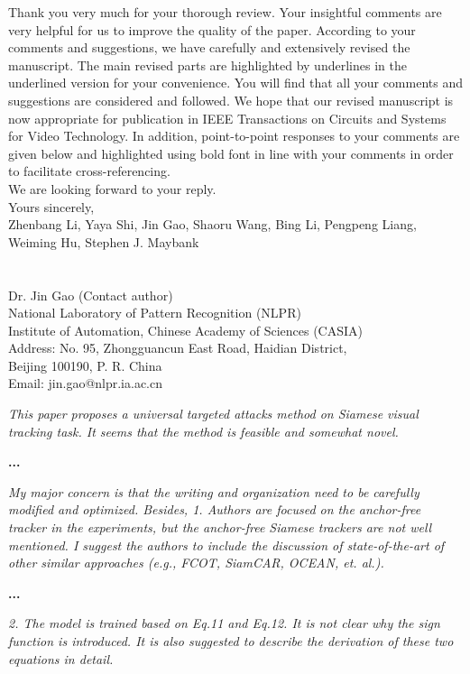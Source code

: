 \documentclass[12pt]{article}
\begin{document}
Thank you very much for your thorough review. Your insightful comments are very helpful for us to improve the quality of the paper. According to your comments and suggestions, we have carefully and extensively revised the manuscript. The main revised parts are highlighted by underlines in the underlined version for your convenience. You will find that all your comments and suggestions are considered and followed. We hope that our revised manuscript is now appropriate for publication in IEEE Transactions on Circuits and Systems for Video Technology.
In addition, point-to-point responses to your comments are given below and highlighted using bold font in line with your comments in order to facilitate cross-referencing.\\[10pt]
\indent We are looking forward to your reply.\\[10pt]
\noindent Yours sincerely,\\
\noindent Zhenbang Li, Yaya Shi, Jin Gao, Shaoru Wang, Bing Li, Pengpeng Liang, Weiming Hu, Stephen J. Maybank
\\
\\
\\
\noindent Dr. Jin Gao (Contact author)\\
\noindent National Laboratory of Pattern Recognition (NLPR)\\
\noindent Institute of Automation, Chinese Academy of Sciences (CASIA)\\
\noindent Address: No. 95, Zhongguancun East Road, Haidian District,\\
\noindent Beijing 100190, P. R. China\\
\noindent Email: jin.gao@nlpr.ia.ac.cn

\newpage
\textit{This paper proposes a universal targeted attacks method on Siamese visual tracking task. It seems that the method is feasible and somewhat novel.}

\textbf{...}

\textit{My major concern is that the writing and organization need to be carefully modified and optimized. Besides, 1. Authors are focused on the anchor-free tracker in the experiments, but the anchor-free Siamese trackers are not well mentioned. I suggest the authors to include the discussion of state-of-the-art of other similar approaches (e.g., FCOT, SiamCAR, OCEAN, et. al.).}

\textbf{...}

\textit{2. The model is trained based on Eq.11 and Eq.12. It is not clear why the sign function is introduced. It is also suggested to describe the derivation of these two equations in detail.}
\end{document}

